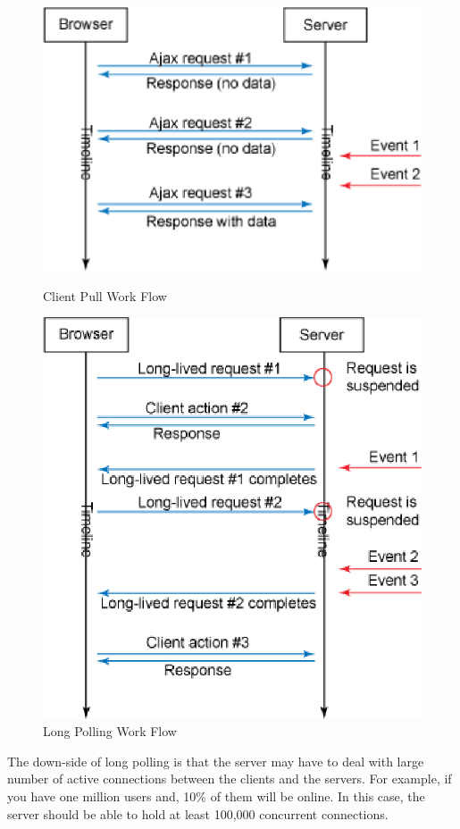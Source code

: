 \begin{figure}[htb!]
\centering
    \includegraphics[scale=0.70]{figures/client_pull.eps}
    \caption{Client Pull Work Flow}
    \label{fig:client_pull}
    \includegraphics[scale=0.70]{figures/long_polling.eps}
    \caption{Long Polling Work Flow}
    \label{fig:long_polling}
\end{figure}

The down-side of long polling is that the server may have to deal with large
number of active connections between the clients and the servers. For example,
if you have one million users and, 10\% of them will be online. In this case,
the server should be able to hold at least 100,000 concurrent connections.

